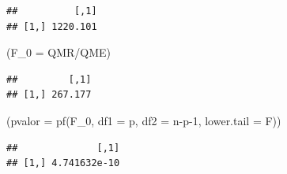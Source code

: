 \documentclass[
]{book}
\newenvironment{Shaded}{\begin{snugshade}}{\end{snugshade}}
\newcommand{\AttributeTok}[1]{\textcolor[rgb]{0.77,0.63,0.00}{#1}}
\newcommand{\DecValTok}[1]{\textcolor[rgb]{0.00,0.00,0.81}{#1}}
\newcommand{\FunctionTok}[1]{\textcolor[rgb]{0.00,0.00,0.00}{#1}}
\newcommand{\NormalTok}[1]{#1}
\newcommand{\SpecialCharTok}[1]{\textcolor[rgb]{0.00,0.00,0.00}{#1}}
\begin{document}
\begin{verbatim}
##          [,1]
## [1,] 1220.101
\end{verbatim}

\begin{Shaded}
\begin{Highlighting}[]
\NormalTok{(}\AttributeTok{F\_0 =}\NormalTok{ QMR}\SpecialCharTok{/}\NormalTok{QME)}
\end{Highlighting}
\end{Shaded}

\begin{verbatim}
##         [,1]
## [1,] 267.177
\end{verbatim}

\begin{Shaded}
\begin{Highlighting}[]
\NormalTok{(}\AttributeTok{pvalor =} \FunctionTok{pf}\NormalTok{(F\_0, }\AttributeTok{df1 =}\NormalTok{ p, }\AttributeTok{df2 =}\NormalTok{ n}\SpecialCharTok{{-}}\NormalTok{p}\DecValTok{{-}1}\NormalTok{, }\AttributeTok{lower.tail =}\NormalTok{ F))}
\end{Highlighting}
\end{Shaded}

\begin{verbatim}
##              [,1]
## [1,] 4.741632e-10
\end{verbatim}
\end{document}
